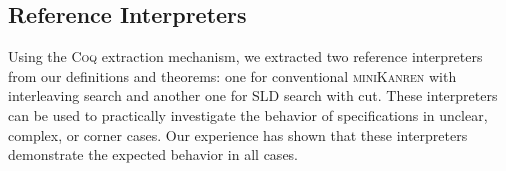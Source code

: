 \subsection{Reference Interpreters}

Using the \textsc{Coq} extraction mechanism, we extracted two reference interpreters from our definitions and theorems: one for conventional
\textsc{miniKanren} with interleaving search and another one for SLD search with cut. These interpreters can be used to practically investigate the behavior
of specifications in unclear, complex, or corner cases. Our experience has shown that these interpreters demonstrate the expected behavior
in all cases.
